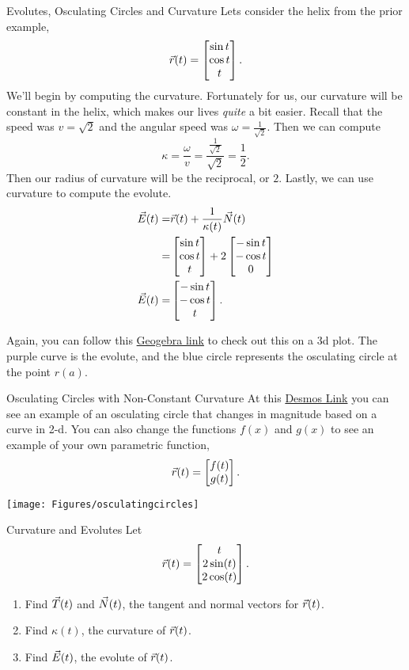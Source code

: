 \begin{example}{Evolutes, Osculating Circles and Curvature}
Lets consider the helix from the prior example, $$\vec{r}(t)=\begin{bmatrix}\sin t\\ \cos t\\ t\end{bmatrix}. $$ We'll begin by computing the curvature. Fortunately for us, our curvature will be constant in the helix, which makes our lives \textit{quite} a bit easier. Recall that the speed was $v=\sqrt{2}$ and the angular speed was $\omega=\frac{1}{\sqrt{2}}$. Then we can compute $$\kappa=\frac{\omega}{v}=\frac{\frac{1}{\sqrt{2}}}{\sqrt{2}}=\frac{1}{2}. $$
Then our radius of curvature will be the reciprocal, or $2$. Lastly, we can use curvature to compute the evolute.
\begin{align*}
\vec{E}(t)=&\vec{r}(t)+\frac{1}{\kappa(t)}\vec{N}(t)\\
=&\begin{bmatrix}\sin t\\ \cos t\\ t\end{bmatrix}+2\begin{bmatrix}-\sin t\\ -\cos t\\ 0\end{bmatrix}\\
\vec{E}(t)=&\begin{bmatrix}-\sin t\\ -\cos t\\ t\end{bmatrix}.
\end{align*}

Again, you can follow this \href{https://www.geogebra.org/3d/fgypvuu4}{Geogebra link} to check out this on a 3d plot. The purple curve is the evolute, and the blue circle represents the osculating circle at the point $r(a)$.
\end{example}

\begin{example}{Osculating Circles with Non-Constant Curvature}
At this \href{https://www.desmos.com/calculator/7leqtbvxck}{Desmos Link} you can see an example of an osculating circle that changes in magnitude based on a curve in 2-d. You can also change the functions $f(x)$ and $g(x)$ to see an example of your own parametric function, $$\vec{r}(t)=\begin{bmatrix}f(t)\\g(t)\end{bmatrix}. $$
\begin{center}
\texttt{[image: Figures/osculatingcircles]}
\end{center}
\end{example}

\begin{exercise}{Curvature and Evolutes}
Let $$\vec{r}(t)=\begin{bmatrix}t\\ 2\sin(t)\\ 2\cos(t)\end{bmatrix}.$$
\vspace{1em}
\begin{enumerate}
\item Find $\vec{T}(t)$ and $\vec{N}(t)$, the tangent and normal vectors for $\vec{r}(t)$.
\vspace{1em}
\item Find $\kappa(t)$, the curvature of $\vec{r}(t)$.
\vspace{1em}
\item Find $\vec{E}(t)$, the evolute of $\vec{r}(t)$.
\end{enumerate}
\end{exercise}

